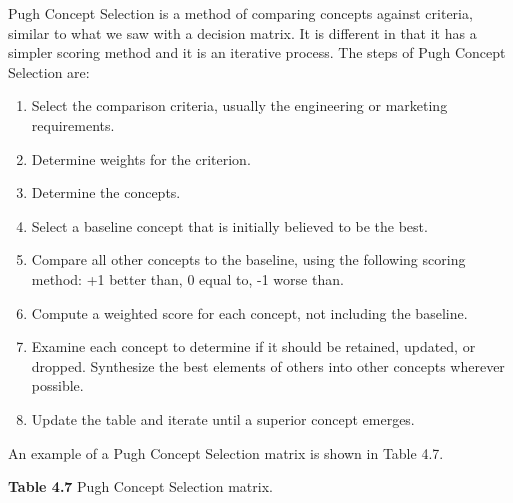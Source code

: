 Pugh Concept Selection is a method of comparing concepts against
criteria, similar to what we saw with a decision matrix. It is different
in that it has a simpler scoring method and it is an iterative process.
The steps of Pugh Concept Selection are:

\begin{enumerate}
\def\labelenumi{\arabic{enumi}.}
\item
  Select the comparison criteria, usually the engineering or marketing
  requirements.
\item
  Determine weights for the criterion.
\item
  Determine the concepts.
\item
  Select a baseline concept that is initially believed to be the best.
\item
  Compare all other concepts to the baseline, using the following
  scoring method: +1 better than, 0 equal to, -1 worse than.
\item
  Compute a weighted score for each concept, not including the baseline.
\item
  Examine each concept to determine if it should be retained, updated,
  or dropped. Synthesize the best elements of others into other concepts
  wherever possible.
\item
  Update the table and iterate until a superior concept emerges.
\end{enumerate}

An example of a Pugh Concept Selection matrix is shown in Table 4.7.

\textbf{Table 4.7} Pugh Concept Selection matrix.

